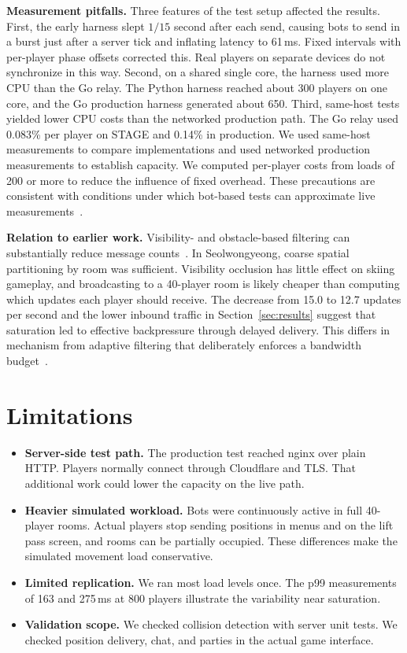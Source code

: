 \documentclass[11pt,a4paper]{article}
\begin{document}
\textbf{Measurement pitfalls.}
Three features of the test setup affected the results. First, the early harness slept \(1/15\)
second after each send, causing bots to send in a burst just after a server tick and inflating
latency to 61\,ms. Fixed intervals with per-player phase offsets corrected this. Real players on
separate devices do not synchronize in this way. Second, on a shared single core, the harness
used more CPU than the Go relay. The Python harness reached about 300 players on one core, and
the Go production harness generated about 650. Third, same-host tests yielded lower CPU costs
than the networked production path. The Go relay used 0.083\% per player on STAGE and 0.14\% in
production. We used same-host measurements to compare implementations and used networked
production measurements to establish capacity. We computed per-player costs from loads of
200 or more to reduce the influence of fixed overhead. These precautions are consistent with
conditions under which bot-based tests can approximate live measurements~\cite{boulanger_2006_10}.

\textbf{Relation to earlier work.}
Visibility- and obstacle-based filtering can substantially reduce message counts~\cite{boulanger_2006_10}.
In Seolwongyeong, coarse spatial partitioning by room was sufficient. Visibility occlusion has
little effect on skiing gameplay, and broadcasting to a 40-player room is likely cheaper than
computing which updates each player should receive. The decrease from 15.0 to 12.7 updates per
second and the lower inbound traffic in Section~\ref{sec:results} suggest that saturation led
to effective backpressure through delayed delivery. This differs in mechanism from adaptive
filtering that deliberately enforces a bandwidth budget~\cite{gascon_samson_2015_6}.
\section{Limitations}
\label{sec:limits}
\begin{itemize}
  \item \textbf{Server-side test path.} The production test reached nginx over plain HTTP.
    Players normally connect through Cloudflare and TLS. That additional work could lower the
    capacity on the live path.
  \item \textbf{Heavier simulated workload.} Bots were continuously active in full 40-player
    rooms. Actual players stop sending positions in menus and on the lift pass screen, and
    rooms can be partially occupied. These differences make the simulated movement load
    conservative.
  \item \textbf{Limited replication.} We ran most load levels once. The p99 measurements of
    163 and 275\,ms at 800 players illustrate the variability near saturation.
  \item \textbf{Validation scope.} We checked collision detection with server unit tests.
    We checked position delivery, chat, and parties in the actual game interface.
\end{itemize}
\end{document}
